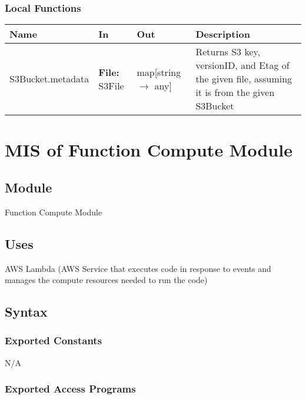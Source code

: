 \documentclass[12pt, titlepage]{article}
\begin{document}
\subsubsection{Local Functions}

\begin{center}
  \begin{tabular}{>{\raggedright}p{4cm} >{\raggedright}p{3cm}
    >{\raggedright}p{3.5cm} p{5.5cm}}
    \hline
    \textbf{Name} & \textbf{In} & \textbf{Out} & \textbf{Description} \\
    \hline
    S3Bucket.metadata & \textbf{File:} S3File & map[string
    $\rightarrow$ any] & Returns S3 key, versionID, and Etag of the
    given file, assuming it is from the given S3Bucket \\
    \hline
  \end{tabular}
\end{center}

\section{MIS of Function Compute Module} \label{Module}

\subsection{Module}

Function Compute Module

\subsection{Uses}

AWS Lambda (AWS Service that executes code in response to events and
manages the compute resources needed to run the code)

\subsection{Syntax}

\subsubsection{Exported Constants}

N/A

\subsubsection{Exported Access Programs}
\end{document}
